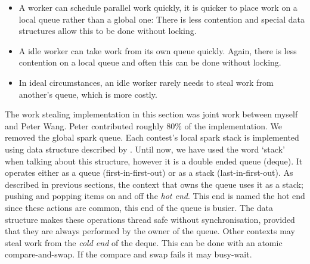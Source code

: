 \begin{itemize}

    \item
    A worker can schedule parallel work quickly,
    it is quicker to place work on a local queue rather than a global
    one:
    There is less contention and special data structures allow this to
    be done without locking.

    \item
    A idle worker can take work from its own queue quickly.
    Again, there is less contention on a local queue and often this can
    be done without locking.

    \item
    In ideal circumstances,
    an idle worker rarely needs to steal work from another's queue,
    which is more costly.

\end{itemize}

The work stealing implementation in this section was joint work between
myself and Peter Wang.
Peter contributed roughly 80\% of the implementation.
We removed the global spark queue.
Each contest's local spark stack is implemented using data structure
described by \citet{workstealing_queue}.
Until now, we have used the word `stack' when talking about this
structure,
however it is a double ended queue (deque).
It operates either as a queue
(first-in-first-out) or as a stack (last-in-first-out).
As described in previous sections, the context that owns the queue uses
it as a stack;
pushing and popping items on and off the \emph{hot end}.
This end is named the hot end since these actions are common, this end
of the queue is busier.
The data structure makes these operations thread safe without
synchronisation,
provided that they are always performed by the owner of the queue.
Other contexts may steal work from the \emph{cold end} of the deque.
This can be done with an atomic compare-and-swap.
If the compare and swap fails it may busy-wait.





